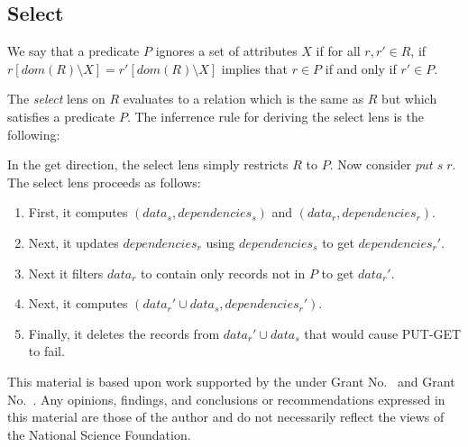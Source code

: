 \documentclass[acmsmall,review,anonymous]{acmart}\settopmatter{printfolios=true,printccs=false,printacmref=false}
\theoremstyle{definition}
\begin{document}
\subsection{Select}
We say that a predicate $P$ ignores a set of attributes $X$ if for all $r, r'
\in R$, if $r[dom(R) \setminus X] = r'[dom(R) \setminus X]$ implies that $r
\in P$ if and only if $r' \in P$.

The {\em select} lens on $R$ evaluates to a relation which is the same as $R$
but which satisfies a predicate $P$. The inferrence rule for deriving the select
lens is the following:
\begin{prooftree}
\end{prooftree}
In the get direction, the select lens simply restricts $R$ to $P$. Now consider
$put \; s \; r$. The select lens proceeds as follows:
\begin{enumerate}
  \item
  First, it computes $(data_s, dependencies_s)$ and $(data_r, dependencies_r)$.
  \item
  Next, it updates $dependencies_r$ using $dependencies_s$ to get
  $dependencies_r'$.
  \item
  Next it filters $data_r$ to contain only records not in $P$ to get $data_r'$.
  \item
  Next, it computes $(data_r' \cup data_s, dependencies_r')$.
  \item
  Finally, it deletes the records from $data_r' \cup data_s$ that would cause
  PUT-GET to fail.
\end{enumerate}
\fi
\begin{acks}                            %
This material is based upon work supported by the
 under Grant
No.~ and Grant
No.~.  Any opinions, findings, and
conclusions or recommendations expressed in this material are those
of the author and do not necessarily reflect the views of the
National Science Foundation.
\end{acks}



\end{document}
